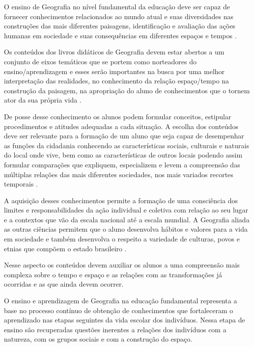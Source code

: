 \begin{refsection}
    O ensino de Geografia no nível fundamental da educação deve ser capaz de fornecer conhecimentos relacionados ao mundo atual e suas diversidades nas construções das mais diferentes paisagens, identificação e avaliação das ações humanas em sociedade e suas consequências em diferentes espaços e tempos \cite{ParâmetrosCurricularesGeografia2001}. 

    Os conteúdos dos livros didáticos de Geografia devem estar abertos a um conjunto de eixos temáticos que se portem como norteadores do ensino/aprendizagem e esses serão importantes na busca por uma melhor interpretação das realidades, no conhecimento da relação espaço/tempo na construção da paisagem, na apropriação do aluno de conhecimentos que o tornem ator da sua própria vida \cite{ParâmetrosCurricularesGeografia2001}. 

    De posse desse conhecimento os alunos podem formular conceitos, estipular procedimentos e atitudes adequadas a cada situação. A escolha dos conteúdos deve ser relevante para a formação de um aluno que seja capaz de desempenhar as funções da cidadania conhecendo as características sociais, culturais e naturais do local onde vive, bem como as características de outros locais podendo assim formular comparações que expliquem, especializem e levem a compreensão das múltiplas relações das mais diferentes sociedades, nos mais variados recortes temporais \cite{ParâmetrosCurricularesGeografia2001}. 

    A aquisição desses conhecimentos permite a formação de uma consciência dos limites e responsabilidades da ação individual e coletiva com relação ao seu lugar e a contextos que vão da escala nacional até a escala mundial. A Geografia aliada as outras ciências permitem que o aluno desenvolva hábitos e valores para a vida em sociedade e também desenvolva o respeito a variedade de culturas, povos e etnias que compõem o estado brasileiro \cite{ParâmetrosCurricularesGeografia2001}. 

    Nesse aspecto os conteúdos devem auxiliar os alunos a uma compreensão mais complexa sobre o tempo e espaço e as relações com as transformações já ocorridas e as que ainda devem ocorrer.   

    O ensino e aprendizagem de Geografia na educação fundamental representa a base no processo contínuo de obtenção de conhecimentos que fortaleceram o aprendizado nas etapas seguintes da vida escolar dos indivíduos. Nessa etapa de ensino são recuperadas questões inerentes a relações dos indivíduos com a natureza, com os grupos sociais e com a construção do espaço.  


\end{refsection}
